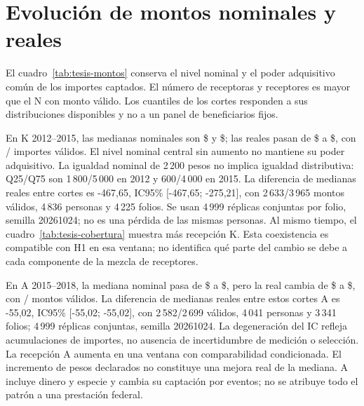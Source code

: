 \section{Evolución de montos nominales y reales}
\label{sec:resultados-montos}

El cuadro~\ref{tab:tesis-montos} conserva el nivel nominal y el poder
adquisitivo común de los importes captados. El número de receptoras y
receptores es mayor que el N con monto válido. Los cuantiles de los
cortes responden a sus distribuciones disponibles y no a un panel de
beneficiarios fijos.


\FloatBarrier

En K 2012--2015, las medianas nominales son
\$ y \$; las reales pasan de
\$ a \$, con
/ importes válidos.
El nivel nominal central sin aumento no mantiene su poder adquisitivo.
La igualdad nominal de 2\,200 pesos no implica igualdad distributiva:
Q25/Q75 son 1\,800/5\,000 en 2012 y 600/4\,000 en 2015. La diferencia
de medianas reales entre cortes es -467{,}65, IC95\% [-467{,}65; -275{,}21],
con 2\,633/3\,965 montos válidos, 4\,836 personas y 4\,225 folios.
Se usan 4\,999 réplicas conjuntas por folio, semilla 20261024;
no es una pérdida de las mismas personas.
Al mismo tiempo, el cuadro~\ref{tab:tesis-cobertura} muestra más recepción K.
Esta coexistencia es compatible con H1 en esa ventana; no identifica
qué parte del cambio se debe a cada componente de la mezcla de receptores.

En A 2015--2018, la mediana nominal pasa de
\$ a \$, pero la real cambia de
\$ a \$, con
/ montos válidos.
La diferencia de medianas reales entre estos cortes A es -55{,}02,
IC95\% [-55{,}02; -55{,}02], con 2\,582/2\,699 válidos, 4\,041 personas y
3\,341 folios; 4\,999 réplicas conjuntas, semilla 20261024. La degeneración
del IC refleja acumulaciones de importes, no ausencia de incertidumbre de
medición o selección. La recepción A aumenta en una ventana con
comparabilidad condicionada.
El incremento de pesos declarados no constituye una mejora real de la
mediana. A incluye dinero y especie y cambia su captación por eventos;
no se atribuye todo el patrón a una prestación federal.

